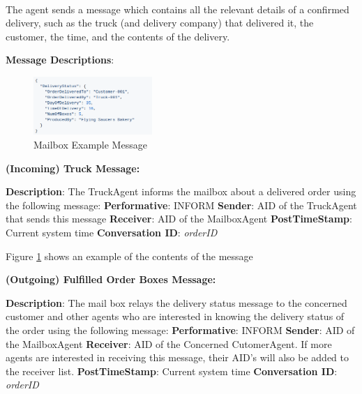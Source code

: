 \documentclass[11pt, a4paper]{article}
\begin{document}
\paragraph{}
The agent sends a message which contains all the relevant details of a confirmed delivery, such as the truck (and delivery company) that delivered it, the customer, the time, and the contents of the delivery.

\hfill\break
\textbf{Message Descriptions}:

	\begin{figure}
		\begin{center}
			\includegraphics[width=0.4\textwidth]{../images/mailboxmsgexample.png}
		\end{center}
		\caption{Mailbox Example Message}
		\label{mailboxmsgexample}
	\end{figure}
\hfill\break
\textbf{(Incoming) Truck Message:}

\hfill\break
\textbf{Description}:
The TruckAgent informs the mailbox about a delivered order using the following message:
\hfill\break
\textbf{Performative}: INFORM
\hfill\break
\textbf{Sender}: AID of the TruckAgent that sends this message
\hfill\break
\textbf{Receiver}: AID of the MailboxAgent
\hfill\break
\textbf{PostTimeStamp}: Current system time
\hfill\break
\textbf{Conversation ID}: \textit{orderID}

\hfill\break
Figure \ref{mailboxmsgexample} shows an example of the contents of the message

\hfill\break	
\textbf{(Outgoing) Fulfilled Order Boxes Message:}

\hfill\break
\textbf{Description}:
The mail box relays the delivery status message to the concerned customer and other agents who are interested in knowing the delivery status of the order using the following message:
\hfill\break
\textbf{Performative}: INFORM
\hfill\break
\textbf{Sender}: AID of the MailboxAgent
\hfill\break
\textbf{Receiver}: AID of the Concerned CutomerAgent. If more agents are interested in receiving this message, their AID's will also be added to the receiver list.
\hfill\break
\textbf{PostTimeStamp}: Current system time
\hfill\break
\textbf{Conversation ID}: \textit{orderID}
\end{document}
